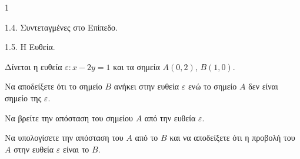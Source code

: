 \begin{ylh}{1}
    \item 1.4. Συντεταγμένες στο Επίπεδο.
    \item 1.5. Η Ευθεία.
\end{ylh}
Δίνεται η ευθεία $\varepsilon: x - 2y = 1$ και τα σημεία $A(0,2)$, $B(1,0)$.
\begin{alist}
\item Να αποδείξετε ότι το σημείο $B$ ανήκει στην ευθεία $\varepsilon$ ενώ το σημείο $A$ δεν είναι σημείο της $\varepsilon$. 
\item Να βρείτε την απόσταση του σημείου $A$ από την ευθεία $\varepsilon$. 
\item Να υπολογίσετε την απόσταση του $A$ από το $B$ και να αποδείξετε ότι η προβολή του $A$ στην ευθεία $\varepsilon$ είναι το $B$. 
\end{alist}